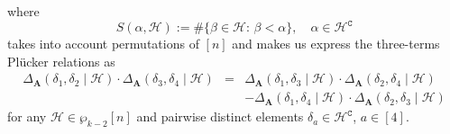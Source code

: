 \documentclass[10pt]{article}
\theoremstyle{remark}%
\theoremstyle{definition}%
\begin{document}
where 
 \begin{equation}
S(\alpha,\mathcal{H}):=\#\{\beta\in\mathcal{H}:\,\beta<\alpha\},\quad\alpha\in\mathcal{H}^{\mathtt{C}}
\label{eq: four splitting indices}
 \end{equation}
takes into account permutations of $[n]$ and makes us express the three-terms Pl\"{u}cker relations \citep{GKZ1994} as  
 \begin{eqnarray}
\Delta_{\mathbf{A}}(\delta_{1},\delta_{2}\mid\mathcal{H})\cdot\Delta_{\mathbf{A}}(\delta_{3},\delta_{4}\mid\mathcal{H}) & = & \Delta_{\mathbf{A}}(\delta_{1},\delta_{3}\mid\mathcal{H})\cdot\Delta_{\mathbf{A}}(\delta_{2},\delta_{4}\mid\mathcal{H})\nonumber \\ 
& & -\Delta_{\mathbf{A}}(\delta_{1},\delta_{4}\mid\mathcal{H})\cdot\Delta_{\mathbf{A}}(\delta_{2},\delta_{3}\mid\mathcal{H})
\label{eq: three-terms Plucker relations, bis}
 \end{eqnarray}
for any $\mathcal{H}\in\wp_{k-2}[n]$ and pairwise distinct elements $\delta_{a}\in\mathcal{H}^{\mathtt{C}}$, $a\in[4]$.
\end{document}
